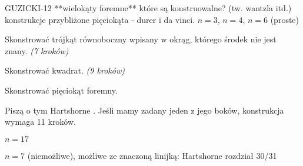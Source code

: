 



GUZICKI-12 **wielokąty foremne** które są konstruowalne? (tw. wantzla itd.) konstrukcje przybliżone pięciokąta - durer i da vinci.
$n = 3$, $n = 4$, $n = 6$ (proste)

\begin{problem}
    Skonstrować trójkąt równoboczny wpisany w okrąg, którego środek nie jest znany. \hfill \emph{(7 kroków)}
\end{problem}

\begin{problem}
    Skonstrować kwadrat. \hfill \emph{(9 kroków)}
\end{problem}

\begin{problem}
    Skonstrować pięciokąt foremny.
\end{problem}

Piszą o tym Hartshorne \cite[s. 45-49]{hartshorne2000}.
Jeśli mamy zadany jeden z jego boków, konstrukcja wymaga 11 kroków. %




$n = 17$

$n = 7$ (niemożliwe), możliwe ze znaczoną linijką: Hartshorne rozdział 30/31
